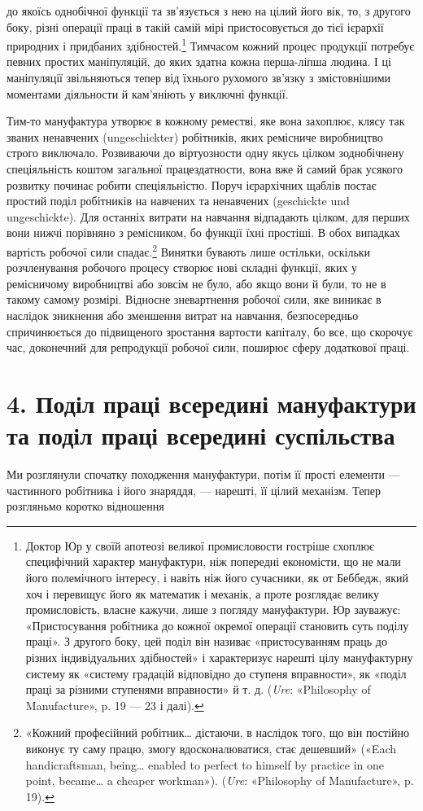 \parcont{}  %
до якоїсь однобічної функції та зв’язується з нею на цілий його
вік, то, з другого боку, різні операції праці в такій самій мірі
пристосовується до тієї ієрархії природних і придбаних здібностей.\footnote{
Доктор Юр у своїй апотеозі великої промисловости гостріше
схоплює специфічний характер мануфактури, ніж попередні економісти,
що не мали його полемічного інтересу, і навіть ніж його сучасники,
як от Беббедж, який хоч і перевищує його як математик і механік, а проте
розглядає велику промисловість, власне кажучи, лише з погляду мануфактури.
Юр зауважує: «Пристосування робітника до кожної окремої
операції становить суть поділу праці». З другого боку, цей поділ він називає
«пристосуванням праць до різних індивідуальних здібностей» і характеризує
нарешті цілу мануфактурну систему як «систему градацій
відповідно до ступеня вправности», як «поділ праці за різними ступенями
вправности» й т. д. (\emph{Ure}: «Philosophy of Manufacture», p. 19 —
23 і далі).
} Тимчасом кожний процес продукції потребує певних
простих маніпуляцій, до яких здатна кожна перша-ліпша людина.
І ці маніпуляції звільняються тепер від їхнього рухомого
зв’язку з змістовнішими моментами діяльности й кам’яніють у
виключні функції.

Тим-то мануфактура утворює в кожному реместві, яке вона
захоплює, клясу так званих ненавчених (ungeschickter) робітників,
яких ремісниче виробництво строго виключало. Розвиваючи
до віртуозности одну якусь цілком зоднобічнену спеціяльність
коштом загальної працездатности, вона вже й самий брак усякого
розвитку починає робити спеціяльністю. Поруч ієрархічних
щаблів постає простий поділ робітників на навчених та ненавчених
(geschickte und ungeschickte). Для останніх витрати
на навчання відпадають цілком, для перших вони нижчі порівняно
з ремісником, бо функції їхні простіші. В обох випадках вартість
робочої сили спадає.\footnote{
«Кожний професійний робітник\dots{} дістаючи, в наслідок того,
що він постійно виконує ту саму працю, змогу вдосконалюватися, стає
дешевший» («Each handicraftsman, being\dots{} enabled to perfect to himself
by practice in one point, became\dots{} a cheaper workman»). (\emph{Ure}:
«Philosophy of Manufacture», p. 19).
} Винятки бувають лише остільки, оскільки
розчленування робочого процесу створює нові складні функції,
яких у ремісничому виробництві або зовсім не було, або якщо вони
й були, то не в такому самому розмірі. Відносне зневартнення
робочої сили, яке виникає в наслідок зникнення або зменшення
витрат на навчання, безпосередньо спричинюється до підвищеного
зростання вартости капіталу, бо все, що скорочує час, доконечний
для репродукції робочої сили, поширює сферу додаткової
праці.

\section*{4. Поділ праці всередині мануфактури та поділ праці
всередині суспільства}

Ми розглянули спочатку походження мануфактури, потім
її прості елементи — частинного робітника і його знаряддя, —
нарешті, її цілий механізм. Тепер розгляньмо коротко відношення
\parbreak{}  %
